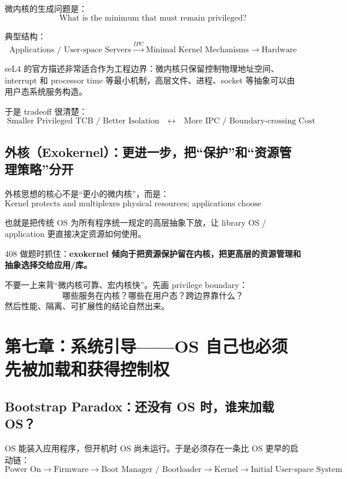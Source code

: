 \documentclass[11pt,a4paper]{ctexart}
\newcommand{\kw}[1]{\textbf{#1}}
\begin{document}
微内核的生成问题是：
\[
\boxed{\text{What is the minimum that must remain privileged?}}
\]

典型结构：
\[
\boxed{
\text{Applications / User-space Servers}
\xrightarrow{IPC}
\text{Minimal Kernel Mechanisms}
\rightarrow
\text{Hardware}
}
\]

seL4 的官方描述非常适合作为工程边界：微内核只保留控制物理地址空间、interrupt 和 processor time 等最小机制，高层文件、进程、socket 等抽象可以由用户态系统服务构造。

于是 tradeoff 很清楚：
\[
\boxed{\text{Smaller Privileged TCB / Better Isolation}}
\quad\leftrightarrow\quad
\boxed{\text{More IPC / Boundary-crossing Cost}}
\]

\subsection{外核（Exokernel）：更进一步，把“保护”和“资源管理策略”分开}

外核思想的核心不是“更小的微内核”，而是：
\[
\boxed{\text{Kernel protects and multiplexes physical resources; applications choose abstractions/policies}}
\]

也就是把传统 OS 为所有程序统一规定的高层抽象下放，让 library OS / application 更直接决定资源如何使用。

408 做题时抓住：\kw{exokernel 倾向于把资源保护留在内核，把更高层的资源管理和抽象选择交给应用/库。}

\begin{exam}[结构题第一动作]
不要一上来背“微内核可靠、宏内核快”。先画 privilege boundary：
\[
\boxed{\text{哪些服务在内核？哪些在用户态？跨边界靠什么？}}
\]
然后性能、隔离、可扩展性的结论自然出来。
\end{exam}

\section{第七章：系统引导——OS 自己也必须先被加载和获得控制权}

\subsection{Bootstrap Paradox：还没有 OS 时，谁来加载 OS？}

OS 能装入应用程序，但开机时 OS 尚未运行。于是必须存在一条比 OS 更早的启动链：
\[
\boxed{
\text{Power On}
\rightarrow
\text{Firmware}
\rightarrow
\text{Boot Manager / Bootloader}
\rightarrow
\text{Kernel}
\rightarrow
\text{Initial User-space System}
}
\]
\end{document}

